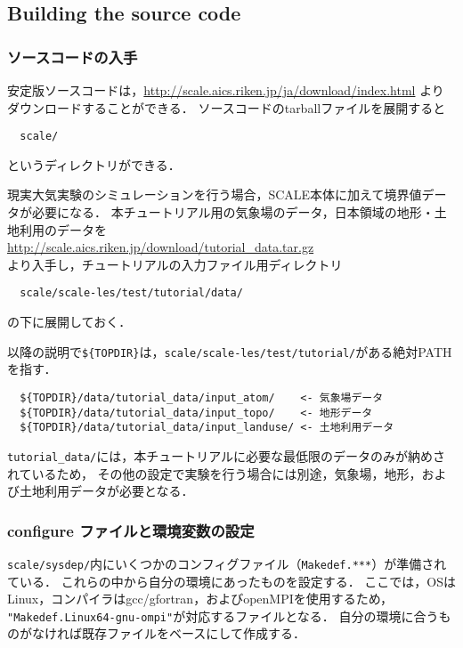 \subsection{Building the source code} \label{sec:source_code}

\subsubsection{ソースコードの入手}

安定版ソースコードは，\url{http://scale.aics.riken.jp/ja/download/index.html}
よりダウンロードすることができる．
ソースコードのtarballファイルを展開すると
\begin{verbatim}
  scale/
\end{verbatim}
というディレクトリができる．

現実大気実験のシミュレーションを行う場合，SCALE本体に加えて境界値データが必要になる．
本チュートリアル用の気象場のデータ，日本領域の地形・土地利用のデータを\\
 \url{http://scale.aics.riken.jp/download/tutorial_data.tar.gz}\\
より入手し，チュートリアルの入力ファイル用ディレクトリ
\begin{verbatim}
  scale/scale-les/test/tutorial/data/
\end{verbatim}
の下に展開しておく．

以降の説明で\verb|${TOPDIR}|は，\verb|scale/scale-les/test/tutorial/|がある絶対PATHを指す．

\begin{verbatim}
  ${TOPDIR}/data/tutorial_data/input_atom/    <- 気象場データ
  ${TOPDIR}/data/tutorial_data/input_topo/    <- 地形データ
  ${TOPDIR}/data/tutorial_data/input_landuse/ <- 土地利用データ
\end{verbatim}
\verb|tutorial_data/|には，本チュートリアルに必要な最低限のデータのみが納めされているため，
その他の設定で実験を行う場合には別途，気象場，地形，および土地利用データが必要となる．


\subsubsection{configure ファイルと環境変数の設定}

\verb|scale/sysdep/|内にいくつかのコンフィグファイル（\verb|Makedef.***|）が準備されている．
これらの中から自分の環境にあったものを設定する．
ここでは，OSはLinux，コンパイラはgcc/gfortran，およびopenMPIを使用するため，
\verb|"Makedef.Linux64-gnu-ompi"|が対応するファイルとなる．
自分の環境に合うものがなければ既存ファイルをベースにして作成する．

